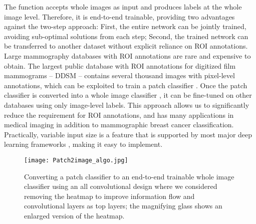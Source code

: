 \documentclass[12pt,letterpaper]{article}
\begin{document}
The function  accepts whole images as input and produces labels at the whole image level. Therefore, it is end-to-end trainable, providing two advantages against the two-step approach: First, the entire network can be jointly trained, avoiding sub-optimal solutions from each step; Second, the trained network can be transferred to another dataset without explicit reliance on ROI annotations. Large mammography databases with ROI annotations are rare and expensive to obtain. The largest public database with ROI annotations for digitized film mammograms – DDSM \cite{heath_digital_2001} – contains several thousand images with pixel-level annotations, which can be exploited to train a patch classifier . Once the patch classifier is converted into a whole image classifier , it can be fine-tuned on other databases using only image-level labels. This approach allows us to significantly reduce the requirement for ROI annotations, and has many applications in medical imaging in addition to mammographic breast cancer classification. Practically, variable input size is a feature that is supported by most major deep learning frameworks \cite{chollet_keras_2015,abadi_tensorflow_2015,jia_caffe_2014,chen_mxnet_2015}, making it easy to implement. 

\begin{figure}
  \centering
  \texttt{[image: Patch2image\_algo.jpg]}
\caption{Converting a patch classifier to an end-to-end trainable whole image classifier using an all convolutional design where we considered removing the heatmap to improve information flow and convolutional layers as top layers; the magnifying glass shows an enlarged version of the heatmap.}
  \label{fig:patch2image}
\end{figure}
\end{document}
